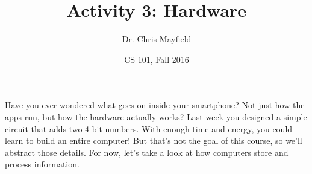 \documentclass[12pt]{article}
\title{Activity 3: Hardware}
\author{Dr. Chris Mayfield}
\date{CS 101, Fall 2016}
\begin{document}
\maketitle

Have you ever wondered what goes on inside your smartphone?
Not just how the apps run, but how the hardware actually works?
Last week you designed a simple circuit that adds two 4-bit numbers.
With enough time and energy, you could learn to build an entire computer!
But that's not the goal of this course, so we'll abstract those details.
For now, let's take a look at how computers store and process information.



\end{document}
